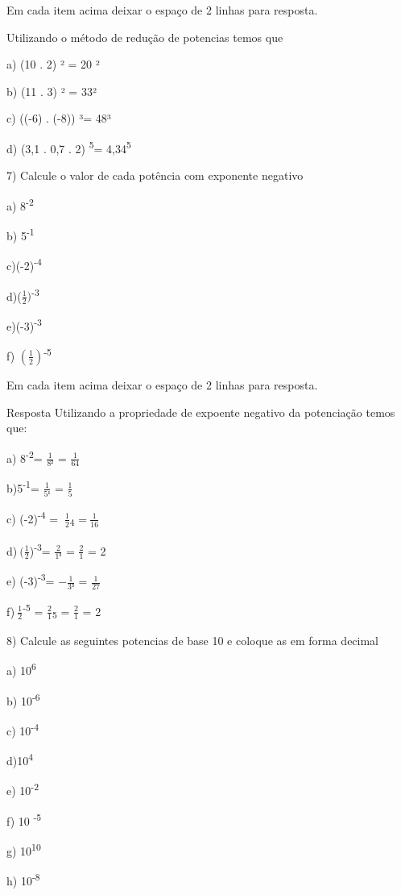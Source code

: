 Em cada item acima deixar o espaço de 2 linhas para resposta.

Utilizando o método de redução de potencias temos que

a) (10 . 2) ² = 20 ²

b) (11 . 3) ² = 33²

c) ((-6) . (-8)) ³= 48³

d) (3,1 . 0,7 . 2) \textsuperscript{5}= 4,34\textsuperscript{5}

7) Calcule o valor de cada potência com exponente negativo

a) 8\textsuperscript{-2}

b) 5\textsuperscript{-1}

c)(-2)\textsuperscript{-4}

d)(\(\frac{1}{2})\)\textsuperscript{-3}

e)(-3)\textsuperscript{-3}

f) \(\left( \frac{1}{2} \right)\)\textsuperscript{-5}

Em cada item acima deixar o espaço de 2 linhas para resposta.

Resposta Utilizando a propriedade de expoente negativo da potenciação
temos que:

a) 8\textsuperscript{-2}= \(\frac{1}{8²}\) = \(\frac{1}{64}\)

b)5\textsuperscript{-1}= \(\frac{1}{5¹}\) = \(\frac{1}{5}\)

c) (-2)\textsuperscript{-4} = \(\ \frac{1}{2}\)\textsubscript{4}
=\(\ \frac{1}{16}\)

d)\(\ (\frac{1}{2}\))\textsuperscript{-3}= \(\frac{2}{1³}\) =
\(\frac{2}{1}\) = 2

e) (-3)\textsuperscript{-3}= \(- \frac{1}{3³}\) = \(\frac{1}{27}\)

f)\(\ \frac{1}{2}\)\textsuperscript{-5} =
\(\frac{2}{1}\)\textsubscript{5} = \(\frac{2}{1}\) = 2

8) Calcule as seguintes potencias de base 10 e coloque as em forma
decimal

a) 10\textsuperscript{6}

b) 10\textsuperscript{-6}

c) 10\textsuperscript{-4}

d)10\textsuperscript{4}

e) 10\textsuperscript{-2}

f) 10 \textsuperscript{-5}

g) 10\textsuperscript{10}

h) 10\textsuperscript{-8}

